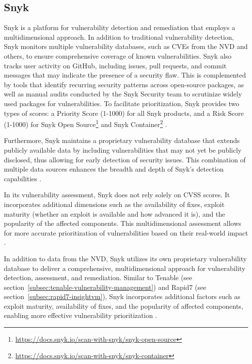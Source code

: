 \subsection{Snyk}
\label{subsec:snyk}

Snyk is a platform for vulnerability detection and remediation that employs a multidimensional approach. In addition to traditional vulnerability detection, Snyk monitors multiple vulnerability databases, such as \ac{CVE}s from the \ac{NVD} and others, to ensure comprehensive coverage of known vulnerabilities. Snyk also tracks user activity on GitHub, including issues, pull requests, and commit messages that may indicate the presence of a security flaw. This is complemented by tools that identify recurring security patterns across open-source packages, as well as manual audits conducted by the Snyk Security team to scrutinize widely used packages for vulnerabilities. To facilitate prioritization, Snyk provides two types of scores: a Priority Score (1-1000) for all Snyk products, and a Risk Score (1-1000) for Snyk Open Source\footnote{\url{https://docs.snyk.io/scan-with-snyk/snyk-open-source}} and Snyk Container\footnote{\url{https://docs.snyk.io/scan-with-snyk/snyk-container}} \autocite{snyk_limited_priority_2024, snyk_limited_risk_2024}.

Furthermore, Snyk maintains a proprietary vulnerability database that extends publicly available data by including vulnerabilities that may not yet be publicly disclosed, thus allowing for early detection of security issues. This combination of multiple data sources enhances the breadth and depth of Snyk’s detection capabilities \autocite{snyk_limited_snyk_2024}.

In its vulnerability assessment, Snyk does not rely solely on \ac{CVSS} scores. It incorporates additional dimensions such as the availability of fixes, exploit maturity (whether an exploit is available and how advanced it is), and the popularity of the affected components. This multidimensional assessment allows for more accurate prioritization of vulnerabilities based on their real-world impact \autocite{snyk_limited_vier_2024}.

In addition to data from the \ac{NVD}, Snyk utilizes its own proprietary vulnerability database to deliver a comprehensive, multidimensional approach for vulnerability detection, assessment, and remediation. Similar to Tenable (see section~\ref{subsec:tenable-vulnerability-management}) and Rapid7 (see section~\ref{subsec:rapid7-insightvm}), Snyk incorporates additional factors such as exploit maturity, availability of fixes, and the popularity of affected components, enabling more effective vulnerability prioritization \autocite{snyk_limited_vier_2024}.

